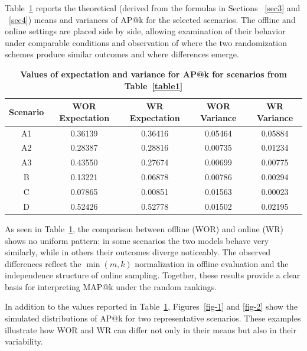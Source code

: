 \documentclass{tpms-l}
\theoremstyle{definition}
\theoremstyle{remark}
\numberwithin{equation}{section}
\begin{document}
Table~\ref{table2} reports the theoretical (derived from the formulas in Sections ~\ref{sec3} and ~\ref{sec4})  means and variances of AP@k for the selected scenarios.  The offline and online settings are placed side by side, allowing examination of their behavior under comparable conditions and observation of where the two randomization schemes produce similar outcomes and where differences emerge.
\begin{center}
\begin{table}[ht] \footnotesize
    \caption{\centering \textbf{Values of expectation and variance for AP@k for scenarios from Table~\ref{table1}}}
    \vspace{-8pt}
    \centering
    \begin{tabular}{|c|c|c|c|c|} 
        \hline
        \textbf{Scenario}    & \textbf{WOR Expectation}& \textbf{WR Expectation} &\textbf{WOR Variance } &\textbf{WR Variance}\\
        \hline
        A1 & 0.36139  & 0.36416  & 0.05464  & 0.05884  \\
        \hline
        A2 & 0.28387  & 0.28816  & 0.00735  & 0.01234  \\
        \hline
        A3 & 0.43550  & 0.27674  & 0.00699  & 0.00775  \\
        \hline
        B  & 0.13221  & 0.06878  & 0.00786  & 0.00294 \\
        \hline
        C  & 0.07865  & 0.00851  & 0.01563  & 0.00023  \\
        \hline
        D  & 0.52426  & 0.52778  & 0.01502  & 0.02195  \\
        \hline
    \end{tabular}
    \label{table2}
\end{table}
\end{center}

As seen in Table~\ref{table2},  the comparison between offline (WOR) and online (WR) shows no uniform pattern: in some scenarios the two models behave very similarly, while in others their outcomes diverge noticeably.  The observed differences reflect the $\min(m,k)$ normalization in offline evaluation and the independence structure of online sampling. Together, these results provide a clear basis for interpreting MAP@k under the random rankings.

In addition to the values reported in Table~\ref{table2}, Figures~\ref{fig-1} and \ref{fig-2} show the simulated distributions of AP@k for two representative scenarios. These examples illustrate how WOR and WR can differ not only in their means but also in their variability.
\end{document}
